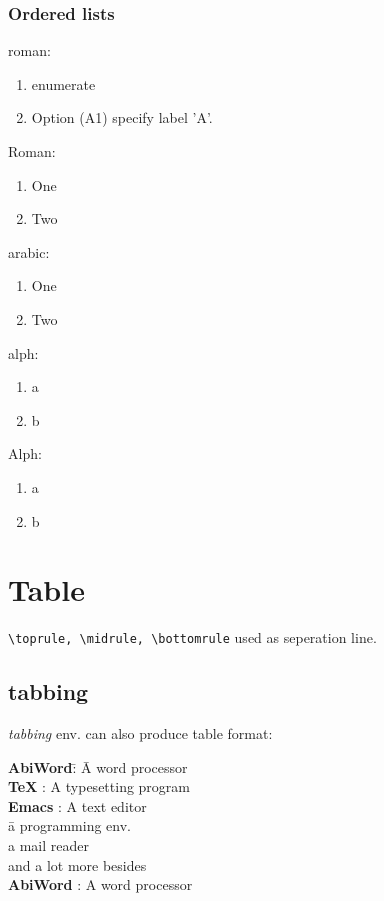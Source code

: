 \subsubsection{Ordered lists}

roman:	\\
\begin{enumerate}[label = (\roman*)]	%
    \item enumerate
    \item Option (A1) specify label 'A'.
\end{enumerate}

Roman:
\begin{enumerate}[label=(\Roman*)]
    \item One
    \item Two
\end{enumerate}

arabic:
\begin{enumerate}[label = (\arabic*)]
    \item One
    \item Two
\end{enumerate}

alph:
\begin{enumerate}[label = (\alph*)]
    \item a
    \item b
\end{enumerate}

Alph:
\begin{enumerate}[label = (\Alph*)]
    \item a
    \item b
\end{enumerate}

\section{Table}

\verb|\toprule, \midrule, \bottomrule| used as seperation line.

\subsection{tabbing}
\emph{tabbing} env. can also produce table format:
\begin{tabbing}
    \textbf{AbiWord}\quad\= : \= A word processor\kill \\
    \textbf{\TeX}\quad	 \> : \> A typesetting program \\[5pt]
    \textbf{Emacs}\quad	 \> : \> A text editor \\[5pt]
			 \>   \> \quad\= a programming env. \\[5pt]
			 \>   \>      \> a mail reader \\[5pt]
			 \>   \>      \> and a lot more besides \\[5pt]
    \textbf{AbiWord}\quad\> : \> A word processor
\end{tabbing}

